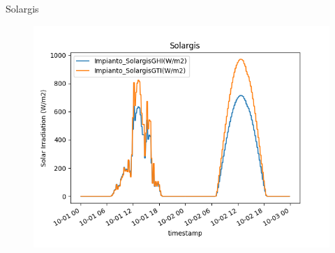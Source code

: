 \begin{frame}{Solargis}
	\begin{figure}
		\centering
		\includegraphics[width=.9\textwidth]{sections/1_dataset/imgs/solargis.png}
	\end{figure}
\end{frame}